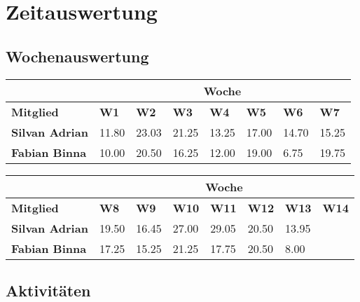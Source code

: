 \chapter{Zeitauswertung}

\section{Wochenauswertung}

\begin{table}[h]
\begin{tabularx}{\linewidth}{l X X X X X X X}
& \multicolumn{7}{c}{\textbf{Woche}}\\
\hline
\textbf{Mitglied} & \textbf{W1} & \textbf{W2} & \textbf{W3} & \textbf{W4} & \textbf{W5} & \textbf{W6} & \textbf{W7} \\
\hline
\textbf{Silvan Adrian} & 11.80  & 23.03  & 21.25 & 13.25 & 17.00 & 14.70 & 15.25  \\
\hline
\textbf{Fabian Binna} & 10.00 & 20.50 & 16.25 & 12.00 & 19.00 & 6.75 & 19.75 \\
\end{tabularx}
\end{table}
\begin{table}[h]
\begin{tabularx}{\linewidth}{l X X X X X X X}
 & \multicolumn{7}{c}{\textbf{Woche}}\\
\hline
\textbf{Mitglied} & \textbf{W8} & \textbf{W9} & \textbf{W10} & \textbf{W11} & \textbf{W12} &
 \textbf{W13} & \textbf{W14}\\
\hline
\textbf{Silvan Adrian} & 19.50 & 16.45 & 27.00 & 29.05  & 20.50  & 13.95 &  \\
\hline
\textbf{Fabian Binna} & 17.25 & 15.25 & 21.25 & 17.75 & 20.50 & 8.00 & \\
\end{tabularx}
\end{table}

\section{Aktivitäten}

\newcommand{\Specification}{34.50}
\newcommand{\Development}{109.95} 
\newcommand{\Testing}{27.00} 
\newcommand{\Allgemein}{146.85} 
\newcommand{\Dokumentation}{85.43} 
\newcommand{\Analyse}{46.00} 



